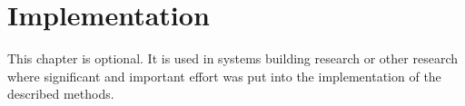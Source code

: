 \chapter{Implementation}
\label{ch:Implementation}

This chapter is optional.
It is used in systems building research or other research
where significant and important effort was put into the
implementation of the described methods.
